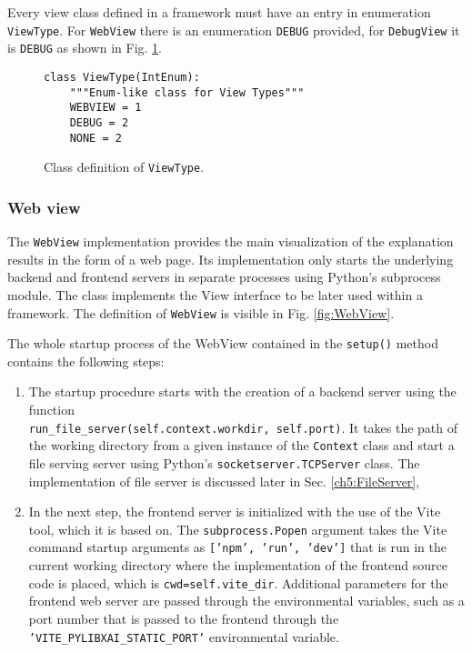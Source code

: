 \documentclass[
    bindingoffset=5mm,  %
    footnoteindent=3mm, %
    hyphenation=true    %
]{src/wut-thesis}
\begin{document}
Every view class defined in a framework must have an entry in enumeration \texttt{ViewType}.
For \texttt{WebView} there is an enumeration \texttt{DEBUG} provided, for \texttt{DebugView}
it is \texttt{DEBUG} as shown in Fig. \ref{fig:ViewType}.

\begin{figure}%
\begin{verbatim}
class ViewType(IntEnum):
    """Enum-like class for View Types"""
    WEBVIEW = 1
    DEBUG = 2
    NONE = 2
\end{verbatim}
\caption{Class definition of \texttt{ViewType}.}
\label{fig:ViewType}
\end{figure}

\subsubsection{Web view}

The \texttt{WebView} implementation provides the main visualization of the explanation results
in the form of a web page. Its implementation only starts the underlying backend and frontend servers
in separate processes using Python's subprocess module.  The class implements the View interface to be later used within a framework. The definition of \texttt{WebView} is visible in Fig. \ref{fig:WebView}.

The whole startup process of the WebView contained in the \texttt{setup()} method contains the following steps:
\begin{enumerate}
    \item The startup procedure starts with the creation of a backend server using the function  \\
        \texttt{run_file_server(self.context.workdir, self.port)}.
        It takes the path of \\ the working directory from a given instance of the \texttt{Context} class
        and start a file serving server using Python's \texttt{socketserver.TCPServer} class.
        The implementation of file server is discussed later in Sec. \ref{ch5:FileServer},
    \item In the next step, the frontend server is initialized with the use of the Vite \cite{ViteDOC} tool,
        which it is based on. The \texttt{subprocess.Popen} argument takes the
        Vite command startup arguments as \texttt{['npm', 'run', 'dev']} that is run in the current working directory where the implementation of the frontend source code is placed, which is \texttt{cwd=self.vite_dir}. Additional parameters for the frontend web server are passed through the environmental variables, such as a port number that is passed to the frontend through the \texttt{'VITE_PYLIBXAI_STATIC_PORT'} environmental variable.
    
\end{enumerate}
\end{document}
